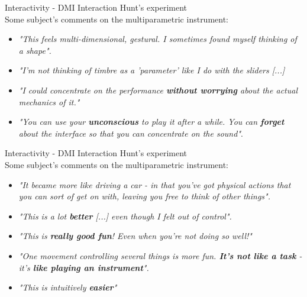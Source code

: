 \documentclass{beamer}
\begin{document}
\begin{frame}{Interactivity - DMI Interaction} 
    Hunt's experiment\\
    \vspace{5mm}
    Some subject's comments on the multiparametric instrument:
    \begin{itemize}
        \item \textit{"This feels multi-dimensional, gestural. I sometimes found myself thinking of a shape".}
        \item \textit{"I'm not thinking of timbre as a 'parameter' like I do with the sliders [...]} 
        \item \textit{"I could concentrate on the performance \textbf{without worrying} about the actual mechanics of it."}
        \item \textit{"You can use your \textbf{unconscious} to play it after a while. You can \textbf{forget} about the interface so that you can concentrate on the sound"}.
     \end{itemize}
\end{frame}
       
\begin{frame}{Interactivity - DMI Interaction} 
    Hunt's experiment\\
    \vspace{5mm}
    Some subject's comments on the multiparametric instrument:
    \begin{itemize}
        \item \textit{"It became more like driving a car - in that you've got physical actions that you can sort of get on with, leaving you free to think of other things".}
        \item \textit{"This is a lot \textbf{better} [...] even though I felt out of control".}
        \item \textit{"This is \textbf{really good fun}! Even when you're not doing so well!"}
        \item \textit{"One movement controlling several things is more fun. \textbf{It's not like a task} - it's \textbf{like playing an instrument}".}
        \item \textit{"This is intuitively \textbf{easier}"}
    \end{itemize}
\end{frame}
\end{document}
